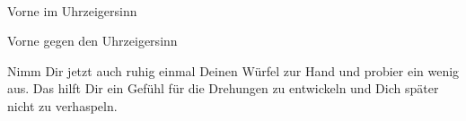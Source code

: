 \\[3em]
\begin{instruction}{Vorne im Uhrzeigersinn}
  \RubikCubeSolved%
  \quad{}
\end{instruction}
\hfil
\begin{instruction}{Vorne gegen den Uhrzeigersinn}
  \RubikCubeSolved%
  \quad{}
\end{instruction}

Nimm Dir jetzt auch ruhig einmal Deinen Würfel zur Hand und probier ein wenig aus.
Das hilft Dir ein Gefühl für die Drehungen zu entwickeln und Dich später nicht zu verhaspeln.
